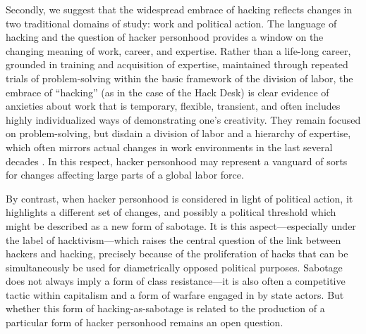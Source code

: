 \documentclass[10pt,letter,oneside]{scrartcl}
\begin{document}
Secondly, we suggest that the widespread embrace of hacking reflects changes in
two traditional domains of study: work and political action.  The language of
hacking and the question of hacker personhood provides a window on the changing
meaning of work, career, and expertise.  Rather than a life-long career, grounded
in training and acquisition of expertise, maintained through repeated trials of
problem-solving within the basic framework of the division of labor, the embrace
of ``hacking'' (as in the case of the Hack Desk) is clear evidence of anxieties
about work that is temporary, flexible, transient, and often includes highly
individualized ways of demonstrating one's creativity.  They remain focused on
problem-solving, but disdain a division of labor and a hierarchy of expertise,
which often mirrors actual changes in work environments in the last several
decades \autocite{Boltanski2005}.  In this respect, hacker personhood may
represent a vanguard of sorts for changes affecting large parts of a global
labor force.

By contrast, when hacker personhood is considered in light of political action,
it highlights a different set of changes, and possibly a political threshold
which might be described as a new form of sabotage.  It is this
aspect---especially under the label of hacktivism---which raises the central
question of the link between hackers and hacking, precisely because of the
proliferation of hacks that can be simultaneously be used for diametrically
opposed political purposes.  Sabotage does not always imply a form of class
resistance---it is also often a competitive tactic within capitalism and a form
of warfare engaged in by state actors.  But whether this form of
hacking-as-sabotage is related to the production of a particular form of hacker
personhood remains an open question. 
\end{document}

